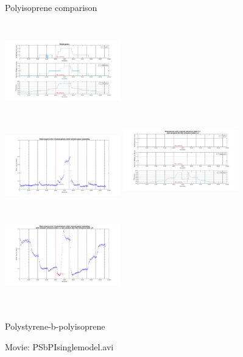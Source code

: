 \documentclass[10pt]{beamer}
\begin{document}
\begin{frame}{Polyisoprene comparison}
\begin{columns}[t]
	\centering
	\includegraphics[width=5cm,height=3.5cm]{PIswelling1.png}\\
	\includegraphics[width=5cm,height=3.5cm]{PIswelling2.png}
	\centering
	\includegraphics[width=5cm,height=4cm]{PIn12n16AVG1.png}\\
	\includegraphics[width=5cm,height=4cm]{PIn12n16AVG2.png}
\end{columns}
\end{frame}

\begin{frame}{Polystyrene-b-polyisoprene}
\begin{center}
\huge Movie: PSbPIsinglemodel.avi
\end{center}
\end{frame}
\end{document}
